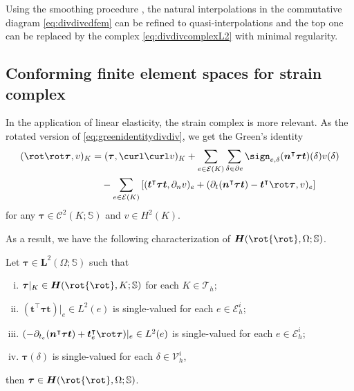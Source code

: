 \begin{remark}\rm
Using the smoothing procedure \cite{ArnoldFalkWinther2006}, the natural interpolations in the commutative diagram \eqref{eq:divdivcdfem} can be refined to quasi-interpolations and the top one can be replaced by the complex \eqref{eq:divdivcomplexL2} with minimal regularity.
\end{remark}

\subsection{Conforming finite element spaces for strain complex}
In the application of linear elasticity, the strain complex is more relevant. 
As the rotated version of \eqref{eq:greenidentitydivdiv}, we get the Green's identity
\begin{align}
(\rot\rot\boldsymbol \tau, v)_K&=(\boldsymbol \tau, \curl\curl v)_K+\sum_{e\in\mathcal E(K)}\sum_{\delta\in\partial e}\sign_{e,\delta}(\boldsymbol  n^{\intercal}\boldsymbol \tau\boldsymbol  t)(\delta)v(\delta) \notag\\
&\quad-\sum_{e\in\mathcal E(K)}\left[(\boldsymbol  t^{\intercal}\boldsymbol \tau \boldsymbol  t, \partial_n v)_{e}+(\partial_{t}(\boldsymbol  n^{\intercal}\boldsymbol \tau\boldsymbol  t)-\boldsymbol  t^{\intercal}\rot\boldsymbol \tau,  v)_{e}\right] \label{eq:greenidentityrotrot}
\end{align}
for any $\boldsymbol \tau\in \mathcal C^2(K; \mathbb S)$ and $v\in H^2(K)$.


As a result, we have the following characterization of $\boldsymbol{H}(\rot{\rot },\Omega; \mathbb{S})$.
\begin{lemma}\label{lem:Hrotrotpatching}
Let $\boldsymbol \tau\in \boldsymbol  L^2(\Omega;\mathbb S)$ such that
\begin{enumerate}[(i)]
\item $\boldsymbol \tau|_K\in \boldsymbol{H}(\rot{\rot },K; \mathbb{S})$ for each $K\in\mathcal T_h$;

\smallskip
\item $(\boldsymbol  t^{\intercal}\boldsymbol \tau\boldsymbol  t)|_e\in L^2(e)$ is single-valued for each $e\in\mathcal E_h^i$;

\smallskip
\item $(-\partial_{t_e}(\boldsymbol  n^{\intercal}\boldsymbol \tau\boldsymbol  t)+\boldsymbol  t_e^{\intercal}\rot\boldsymbol \tau)|_e\in L^2(e)$ is single-valued for each $e\in\mathcal E_h^i$;

\smallskip
\item $\boldsymbol \tau(\delta)$ is single-valued for each $\delta\in\mathcal V_h^i$,
\end{enumerate}
then $\boldsymbol \tau\in \boldsymbol{H}(\rot{\rot },\Omega; \mathbb{S})$.
\end{lemma}

